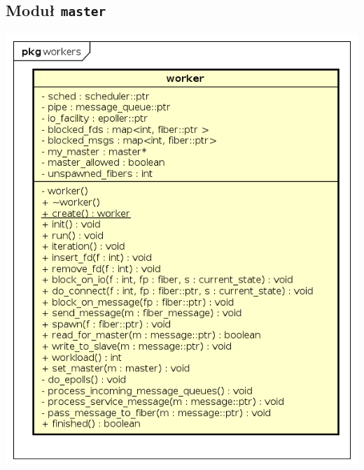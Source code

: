 \documentclass[11pt,makeidx]{mwart}
\newcommand{\code}{\texttt}
\begin{document}
\subsection{Moduł \code{master}}
\label{sec:master}
		\includegraphics[scale=.5]{Worker.png}
%
\end{document}
